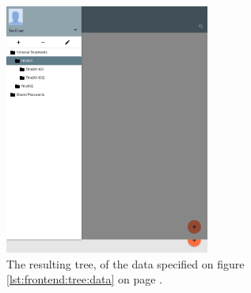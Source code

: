 		\begin{figure}[!htb]
			\centering
			\includegraphics[width=0.6\textwidth,clip,trim=0 690 536 210]{figures/implementation/screenshots/example_tree.png}
			\caption{The resulting tree, of the data specified on figure \ref{lst:frontend:tree:data} on page \pageref{lst:frontend:tree:data}.}
			\label{lst:frontend:tree:result}
		\end{figure}